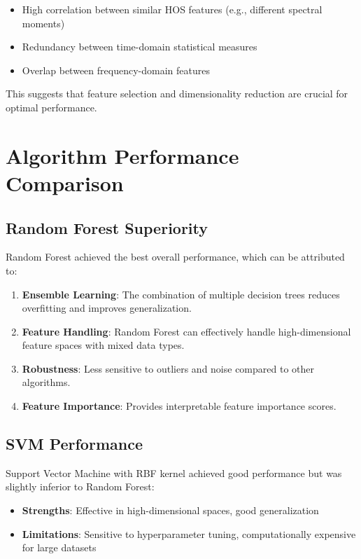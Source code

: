 \begin{itemize}
    \item High correlation between similar HOS features (e.g., different spectral moments)
    \item Redundancy between time-domain statistical measures
    \item Overlap between frequency-domain features
\end{itemize}

This suggests that feature selection and dimensionality reduction are crucial for optimal performance.

\section{Algorithm Performance Comparison}

\subsection{Random Forest Superiority}

Random Forest achieved the best overall performance, which can be attributed to:

\begin{enumerate}
    \item \textbf{Ensemble Learning}: The combination of multiple decision trees reduces overfitting and improves generalization.
    \item \textbf{Feature Handling}: Random Forest can effectively handle high-dimensional feature spaces with mixed data types.
    \item \textbf{Robustness}: Less sensitive to outliers and noise compared to other algorithms.
    \item \textbf{Feature Importance}: Provides interpretable feature importance scores.
\end{enumerate}

\subsection{SVM Performance}

Support Vector Machine with RBF kernel achieved good performance but was slightly inferior to Random Forest:

\begin{itemize}
    \item \textbf{Strengths}: Effective in high-dimensional spaces, good generalization
    \item \textbf{Limitations}: Sensitive to hyperparameter tuning, computationally expensive for large datasets
\end{itemize}

